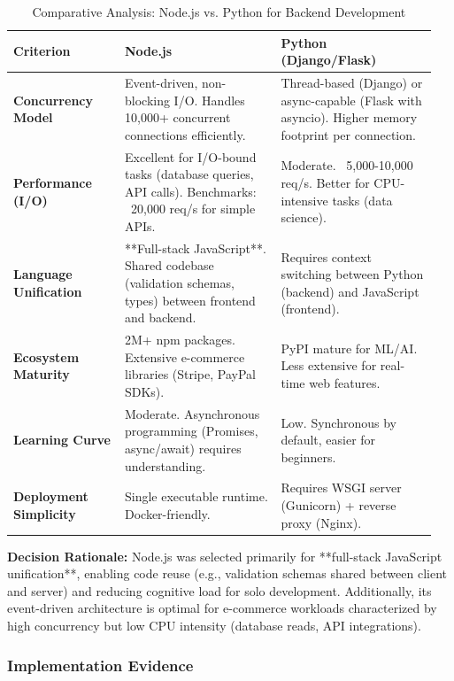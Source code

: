 \begin{table}[H]
\centering
\caption{Comparative Analysis: Node.js vs. Python for Backend Development}
\label{tab:nodejs_vs_python}
\begin{tabular}{@{}p{0.25\linewidth}p{0.35\linewidth}p{0.35\linewidth}@{}}
\toprule
\textbf{Criterion} & \textbf{Node.js} & \textbf{Python (Django/Flask)} \\
\midrule
\textbf{Concurrency Model} & Event-driven, non-blocking I/O. Handles 10,000+ concurrent connections efficiently. & Thread-based (Django) or async-capable (Flask with asyncio). Higher memory footprint per connection. \\
\textbf{Performance (I/O)} & Excellent for I/O-bound tasks (database queries, API calls). Benchmarks: ~20,000 req/s for simple APIs. & Moderate. ~5,000-10,000 req/s. Better for CPU-intensive tasks (data science). \\
\textbf{Language Unification} & **Full-stack JavaScript**. Shared codebase (validation schemas, types) between frontend and backend. & Requires context switching between Python (backend) and JavaScript (frontend). \\
\textbf{Ecosystem Maturity} & 2M+ npm packages. Extensive e-commerce libraries (Stripe, PayPal SDKs). & PyPI mature for ML/AI. Less extensive for real-time web features. \\
\textbf{Learning Curve} & Moderate. Asynchronous programming (Promises, async/await) requires understanding. & Low. Synchronous by default, easier for beginners. \\
\textbf{Deployment Simplicity} & Single executable runtime. Docker-friendly. & Requires WSGI server (Gunicorn) + reverse proxy (Nginx). \\
\bottomrule
\end{tabular}
\end{table}

\textbf{Decision Rationale:} Node.js was selected primarily for **full-stack JavaScript unification**, enabling code reuse (e.g., validation schemas shared between client and server) and reducing cognitive load for solo development. Additionally, its event-driven architecture is optimal for e-commerce workloads characterized by high concurrency but low CPU intensity (database reads, API integrations).

\subsubsection{Implementation Evidence}

